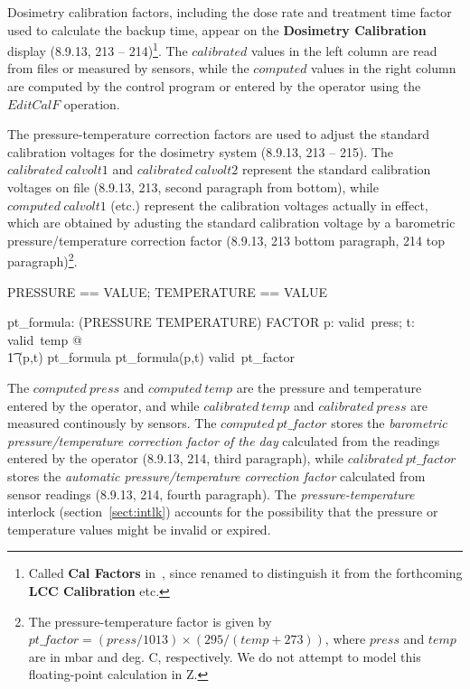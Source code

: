 \documentclass{article}
\begin{document}
Dosimetry calibration factors, including the dose rate and treatment
time factor used to calculate the backup time, appear on the 
{\bf Dosimetry Calibration} display (8.9.13, 213 -- 214)\footnote{Called
{\bf Cal Factors} in~\cite{jacky92}, since renamed to distinguish it
from the forthcoming {\bf LCC Calibration} etc.}.
The $calibrated$ values in the left column are read from
files or measured by sensors, while the $computed$ values in the right
column are computed by the control program or entered by the operator
using the $EditCalF$ operation.

The pressure-temperature correction factors are used to adjust the
standard calibration voltages for the dosimetry system (8.9.13, 213 --
215).  The $calibrated~calvolt1$ and $calibrated~calvolt2$ represent
the standard calibration voltages on file (8.9.13, 213, second
paragraph from bottom), while $computed~calvolt1$ (etc.) represent the
calibration voltages actually in effect, which are obtained by
adusting the standard calibration voltage by a barometric
pressure/temperature correction factor (8.9.13, 213 bottom paragraph,
214 top paragraph)\footnote{The pressure-temperature factor is given
by $pt\_factor = (press/1013) \times (295/(temp+273))$, where $press$
and $temp$ are in mbar and deg. C, respectively. We do not attempt to
model this floating-point calculation in Z.}.

\begin{zed} PRESSURE == VALUE; TEMPERATURE == VALUE \end{zed}

\begin{axdef}
	pt\_formula: (PRESSURE \cross TEMPERATURE) \pfun FACTOR
\where
	\forall p: valid~press; t: valid~temp @ \\
\t1	 (p,t) \in \dom pt\_formula \land pt\_formula(p,t) \in valid~pt\_factor
\end{axdef}
The $computed~press$ and $computed~temp$ are the pressure and
temperature entered by the operator, and while $calibrated~temp$ and
$calibrated~press$ are measured continously by sensors. The
$computed~pt\_factor$ stores the 
{\em barometric pressure/temperature correction factor of the day} 
calculated from the readings entered by
the operator (8.9.13, 214, third paragraph), while
$calibrated~pt\_factor$ stores the 
{\em automatic pressure/temperature correction factor} 
calculated from sensor readings (8.9.13, 214,
fourth paragraph).  The {\em pressure-temperature} interlock
(section~\ref{sect:intlk}) accounts for the possibility that the
pressure or temperature values might be invalid or expired.
\end{document}
